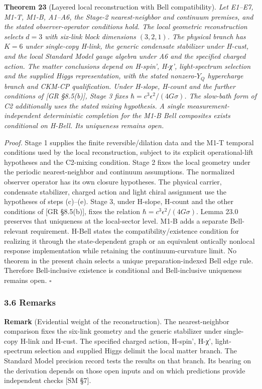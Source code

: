 \documentclass[
]{article}
\begin{document}
\textbf{Theorem 23} (Layered local reconstruction with Bell
compatibility). \emph{Let E1--E7, M1-T, M1-B, A1--A6, the Stage-2
nearest-neighbor and continuum premises, and the stated
observer-operator conditions hold. The local geometric reconstruction
selects \(d=3\) with six-link block dimensions \((3,2,1)\). The physical
branch has \(K=6\) under single-copy H-link, the generic condensate
stabilizer under H-cust, and the local Standard Model gauge algebra
under A6 and the specified charged action. The matter conclusions depend
on H-spin', H-χ', light-spectrum selection and the supplied Higgs
representation, with the stated nonzero-\(Y_Q\) hypercharge branch and
CKM-CP qualification. Under H-slope, H-count and the further conditions
of {[}GR §8.5(b){]}, Stage 3 fixes \(\hbar=c^3\epsilon^2/(4G\sigma)\).
The slow-bath form of C2 additionally uses the stated mixing hypothesis.
A single measurement-independent deterministic completion for the M1-B
Bell composites exists conditional on H-Bell. Its uniqueness remains
open.}

\emph{Proof.} Stage 1 supplies the finite reversible/dilation data and
the M1-T temporal conditions used by the local reconstruction, subject
to its explicit operational-lift hypotheses and the C2-mixing condition.
Stage 2 fixes the local geometry under the periodic nearest-neighbor and
continuum assumptions. The normalized observer operator has its own
closure hypotheses. The physical carrier, condensate stabilizer, charged
action and light chiral assignment use the hypotheses of steps (c)--(e).
Stage 3, under H-slope, H-count and the other conditions of {[}GR
§8.5(b){]}, fixes the relation \(\hbar=c^3\epsilon^2/(4G\sigma)\). Lemma
23.0 preserves that uniqueness at the local-sector level. M1-B adds a
separate Bell-relevant requirement. H-Bell states the
compatibility/existence condition for realizing it through the
state-dependent graph or an equivalent ontically nonlocal response
implementation while retaining the continuum-curvature limit. No theorem
in the present chain selects a unique preparation-indexed Bell edge
rule. Therefore Bell-inclusive existence is conditional and
Bell-inclusive uniqueness remains open. \(\square\)

\hypertarget{remarks}{%
\subsubsection{3.6 Remarks}\label{remarks}}

\textbf{Remark} (Evidential weight of the reconstruction). The
nearest-neighbor comparison fixes the six-link geometry and the generic
stabilizer under single-copy H-link and H-cust. The specified charged
action, H-spin', H-χ', light-spectrum selection and supplied Higgs
delimit the local matter branch. The Standard Model precision record
tests the results on that branch. Its bearing on the derivation depends
on those open inputs and on which predictions provide independent checks
{[}SM §7{]}.
\end{document}
